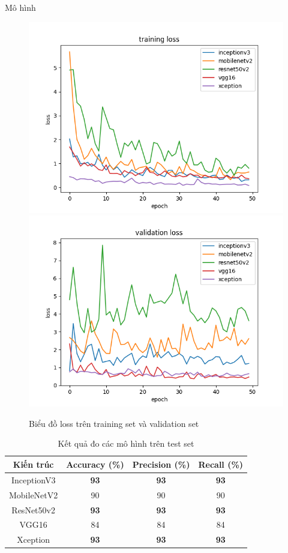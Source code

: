 \documentclass{beamer}
\begin{document}
\begin{frame}[allowframebreaks]{Mô hình}
	\begin{figure}[H]
		\centering
		\includegraphics[scale=0.32]{images/loss.png}
		\includegraphics[scale=0.32]{images/val_loss.png}
		\caption{Biểu đồ loss trên training set và validation set}
	\end{figure}

	\framebreak

	\begin{table}[H]
		\centering
		\begin{tabular}{|c|c|c|c|}
			\hline
			Kiến trúc   & Accuracy (\%) & Precision (\%) & Recall (\%) \\ \hline
			InceptionV3 & \textbf{93}   & \textbf{93}    & \textbf{93} \\
			MobileNetV2 & 90            & 90             & 90          \\
			ResNet50v2  & \textbf{93}   & \textbf{93}    & \textbf{93} \\
			VGG16       & 84            & 84             & 84          \\
			Xception    & \textbf{93}   & \textbf{93}    & \textbf{93} \\ \hline
		\end{tabular}
		\caption{Kết quả đo các mô hình trên test set}
	\end{table}


\end{frame}
\end{document}
